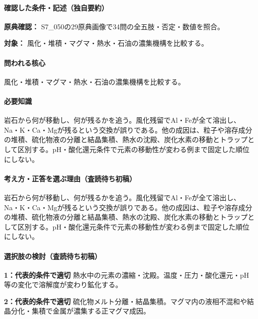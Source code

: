 \paragraph{確認した条件・記述（独自要約）}\mbox{}\par

\noindent\textbf{原典確認：} S7\_050の29原典画像で34問の全五肢・否定・数値を照合。\par

\noindent\textbf{対象：} 風化・堆積・マグマ・熱水・石油の濃集機構を比較する。\par

\paragraph{問われる核心} 風化・堆積・マグマ・熱水・石油の濃集機構を比較する。

\paragraph{必要知識} 岩石から何が移動し、何が残るかを追う。風化残留でAl・Feが全て溶出し、Na・K・Ca・Mgが残るという交換が誤りである。他の成因は、粒子や溶存成分の堆積、硫化物液の分離と結晶集積、熱水の沈殿、炭化水素の移動とトラップとして区別する。pH・酸化還元条件で元素の移動性が変わる例まで固定した順位にしない。

\paragraph{考え方・正答を選ぶ理由（査読待ち初稿）} 岩石から何が移動し、何が残るかを追う。風化残留でAl・Feが全て溶出し、Na・K・Ca・Mgが残るという交換が誤りである。他の成因は、粒子や溶存成分の堆積、硫化物液の分離と結晶集積、熱水の沈殿、炭化水素の移動とトラップとして区別する。pH・酸化還元条件で元素の移動性が変わる例まで固定した順位にしない。

\paragraph{選択肢の検討（査読待ち初稿）}\mbox{}\par

\noindent\textbf{1：代表的条件で適切} 熱水中の元素の濃縮・沈殿。温度・圧力・酸化還元・pH等の変化で溶解度が変わり鉱化する。\par

\noindent\textbf{2：代表的条件で適切} 硫化物メルト分離・結晶集積。マグマ内の液相不混和や結晶分化・集積で金属が濃集する正マグマ成因。\par

